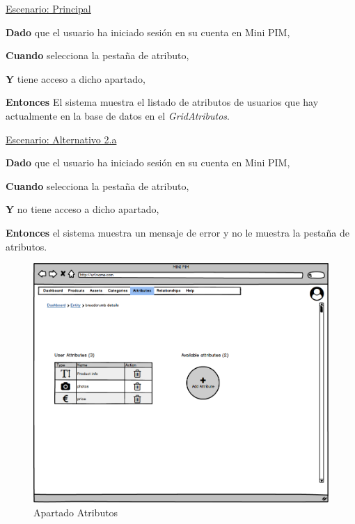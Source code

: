 \underline{Escenario: Principal}\par
\vspace{0.15cm}
\textbf{Dado} que el usuario ha iniciado sesión en su cuenta en Mini PIM,\par
\textbf{Cuando} selecciona la pestaña de atributo,\par
\textbf{Y} tiene acceso a dicho apartado,\par
\textbf{Entonces} El sistema muestra el listado de atributos de usuarios que hay actualmente en la base de datos en el \textit{GridAtributos}.\par
\vspace{0.20cm}

\underline{Escenario: Alternativo 2.a}\par
\vspace{0.15cm}
\textbf{Dado} que el usuario ha iniciado sesión en su cuenta en Mini PIM,\par
\textbf{Cuando} selecciona la pestaña de atributo,\par
\textbf{Y} no tiene acceso a dicho apartado,\par
\textbf{Entonces} el sistema muestra un mensaje de error y no le muestra la pestaña de atributos.\par
\vspace{0.20cm}

\begin{figure}[H]
    \includegraphics[width=1\linewidth]{mockups/RF6.1Crear_Atributo.png}
    \caption{Apartado Atributos}
   \end{figure}
\vspace{1.0cm}

\newpage %